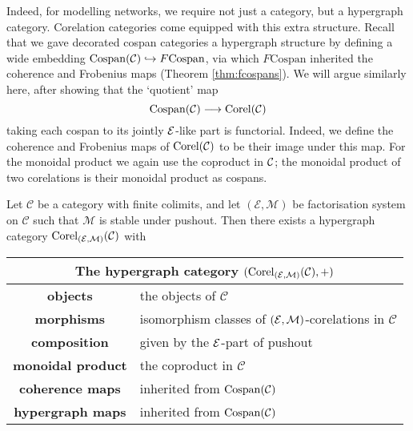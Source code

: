 %
%

Indeed, for modelling networks, we require not just a category, but a hypergraph
category. Corelation categories come equipped with this extra structure.
Recall that we gave decorated cospan categories a hypergraph structure by
defining a wide embedding $\mathrm{Cospan}(\mathcal C) \hookrightarrow
F\mathrm{Cospan}$, via which $F\mathrm{Cospan}$ inherited the coherence and
Frobenius maps (Theorem \ref{thm:fcospans}). We will argue similarly here, after
showing that the `quotient' map
\[
  \operatorname{{Cospan}}(\mathcal C) \longrightarrow \operatorname{{Corel}}(\mathcal C)
\]
taking each cospan to its jointly $\mathcal E$-like part is functorial. Indeed, we
define the coherence and Frobenius maps of $\operatorname{{Corel}}(\mathcal C)$ to be their image
under this map. For the monoidal product we again use the coproduct in $\mathcal C$;
the monoidal product of two corelations is their monoidal product as cospans.

\begin{theorem} \label{thm.cospantocorel}
  Let $\mathcal C$ be a category with finite colimits, and let $(\mathcal E,
  \mathcal M)$ be factorisation system on $\mathcal C$ such that $\mathcal M$ is
  stable under pushout. Then there exists a hypergraph category
  $\mathrm{Corel}_{(\mathcal E,\mathcal M)}(\mathcal C)$ with 
  \begin{center}
    \begin{tabular}{| c | p{} |}
      \hline
      \multicolumn{2}{|c|}{The hypergraph category $(\mathrm{Corel}_{(\mathcal E,\mathcal M)}(\mathcal C),+)$} \\
      \hline
      \textbf{objects} & the objects of $\mathcal C$ \\ 
      \textbf{morphisms} & isomorphism classes of $(\mathcal E,\mathcal M)$-corelations in $\mathcal C$\\ 
      \textbf{composition} & given by the $\mathcal E$-part of pushout \\
      \textbf{monoidal product} & the coproduct in $\mathcal C$ \\
      \textbf{coherence maps} & inherited from $\operatorname{{Cospan}}(\mathcal C)$  \\
      \textbf{hypergraph maps} & inherited from $\operatorname{{Cospan}}(\mathcal C)$ \\
      \hline
    \end{tabular}
  \end{center}  
\end{theorem}

